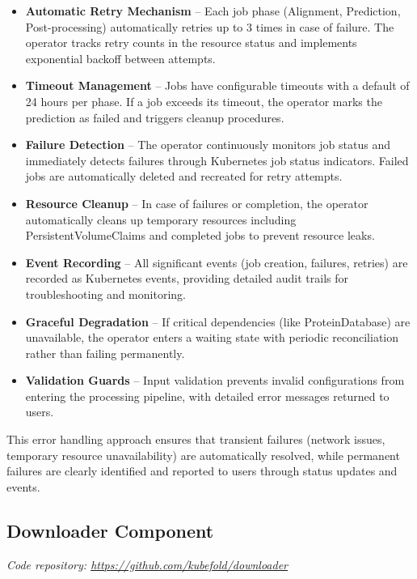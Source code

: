 \begin{itemize}
    \item \textbf{Automatic Retry Mechanism} -- Each job phase (Alignment, Prediction, Post-processing) automatically retries up to 3 times in case of failure. 
    The operator tracks retry counts in the resource status and implements exponential backoff between attempts.
    
    \item \textbf{Timeout Management} -- Jobs have configurable timeouts with a default of 24 hours per phase. 
    If a job exceeds its timeout, the operator marks the prediction as failed and triggers cleanup procedures.
    
    \item \textbf{Failure Detection} -- The operator continuously monitors job status and immediately detects failures through Kubernetes job status indicators.
    Failed jobs are automatically deleted and recreated for retry attempts.
    
    \item \textbf{Resource Cleanup} -- In case of failures or completion, the operator automatically cleans up temporary resources including PersistentVolumeClaims and completed jobs to prevent resource leaks.
    
    \item \textbf{Event Recording} -- All significant events (job creation, failures, retries) are recorded as Kubernetes events, providing detailed audit trails for troubleshooting and monitoring.
    
    \item \textbf{Graceful Degradation} -- If critical dependencies (like ProteinDatabase) are unavailable, the operator enters a waiting state with periodic reconciliation rather than failing permanently.
    
    \item \textbf{Validation Guards} -- Input validation prevents invalid configurations from entering the processing pipeline, with detailed error messages returned to users.
\end{itemize}

This error handling approach ensures that transient failures (network issues, temporary resource unavailability) are automatically resolved, while permanent failures are clearly identified and reported to users through status updates and events.

\subsection{Downloader Component}\label{subsec:component-downloader}
\textit{Code repository: \url{https://github.com/kubefold/downloader}}

